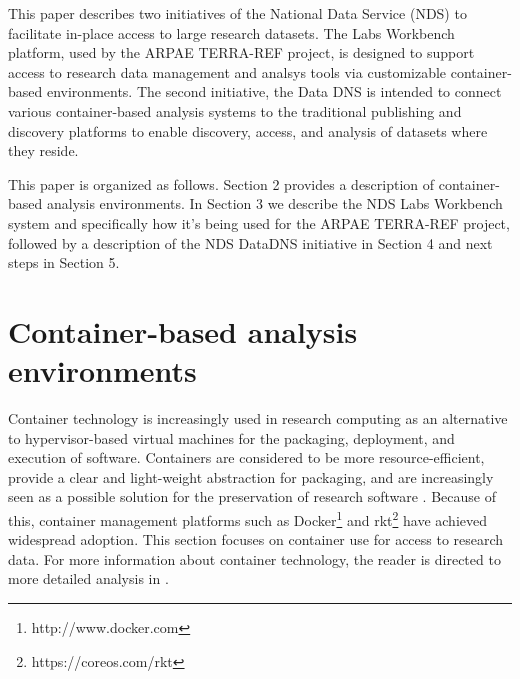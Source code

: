 \documentclass{sig-alternate}
\begin{document}
This paper describes two initiatives of the National Data Service (NDS) to facilitate in-place access to large research datasets. The Labs Workbench platform, used by the ARPAE TERRA-REF project, is designed to support access to research data management and analsys tools via customizable container-based environments.  The second initiative, the Data DNS is intended to connect various container-based analysis systems to the traditional publishing and discovery platforms to enable discovery, access, and analysis of datasets where they reside.



This paper is organized as follows.  Section 2 provides a description of container-based analysis environments.  In Section 3 we describe the NDS Labs Workbench system and specifically how it's being used for the ARPAE TERRA-REF project, followed by a description of the NDS DataDNS initiative in Section 4 and next steps in Section 5.



\section{Container-based analysis environments}

Container technology is increasingly used in research computing as an alternative to hypervisor-based virtual machines for the packaging, deployment, and execution of software. Containers are considered to be more resource-efficient, provide a clear and light-weight abstraction for packaging, and are increasingly seen as a possible solution for the preservation of research software \cite{Meng2015137}.  Because of this, container management platforms such as Docker\footnote{http://www.docker.com} and rkt\footnote{https://coreos.com/rkt} have achieved widespread adoption. This section focuses on container use for access to research data. For more information about container technology, the reader is directed to more detailed analysis in \cite{7036275,7095802,Soltesz:2007:COS:1272998.1273025}. 
\end{document}
